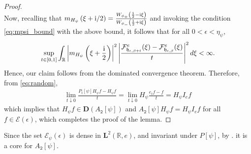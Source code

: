 \documentclass[12pt]{amsart}
\numberwithin{equation}{section}
\newcommand{\bb}{\mathbb}
\newcommand{\cc}{\mathcal}
\newcommand{\mf}{\mathfrak}
\newcommand{\ttt}{\mathtt}
\newcommand{\bmrm}[2][2]{\mathbf{#2}^{#1}}
\newcommand{\Hpsi}{H_\psi}
\newcommand{\fouho}{\cc{F}^{e}}
\newcommand{\D}{\mathbf{D}}
\newcommand{\eps}{\epsilon}
\newcommand{\heb}{\mf{h}_{\eps,\beta}}
\renewcommand{\i}{\mathrm{i}}
\newcommand{\LRe}{\bmrm{L}(\bb{R},e)}
\theoremstyle{definition}
\theoremstyle{assump}
\theoremstyle{remark}
\begin{document}
{\begin{proof}
\begin{equation*}
 \end{equation*}
 Now, recalling that $m_{H_\psi}\left(\xi+{\rm{i}}/2\right)=\frac{W_{\phi_+}\left(\frac{1}{2}-\i\xi\right)}{W_{\phi_-}\left(\frac{1}{2}+\i\xi\right)}$ and invoking the condition \eqref{eq:mpsi_bound} with the above bound, it follows that for all $0<\eps<\eta_\psi$,
 \begin{align*}
 	\sup_{t\in [0,1]}\int_{\bb R}\left|m_{\Hpsi}\left(\xi+\frac{{\rm{i}}}{2}\right)\right|^2\left|\frac{\fouho_{\mathfrak{h}_{\eps,\beta+t}}(\xi)-\fouho_{\heb}(\xi)}{t}\right|^2d\xi<\infty.
 \end{align*}
 Hence, our claim follows from the dominated convergence theorem. Therefore, from \eqref{eq:random},
 \begin{align*}
 \lim_{t\downarrow 0}\frac{P_t[\psi]\Hpsi f-\Hpsi f}{t}=\lim_{t\downarrow 0}\Hpsi\frac{e_t f-f}{t}=\Hpsi I_{e} f
 \end{align*}
which implies that $\Hpsi f\in \D(A_\ttt{2}[\psi])$ and $A_\ttt{2}[\psi]\Hpsi f=\Hpsi I_{e}f$ for all $f\in\cc{E}(\eps)$, which completes the proof of the lemma.
\end{proof}
\noindent
Since the set $\cc{E}_\psi(\eps)$ is dense in $\LRe$, and invariant under $P[\psi]$, by \cite[Proposition~1.7]{engel-nagel}. it is a core for $A_\ttt{2}[\psi]$.

}
\end{document}
